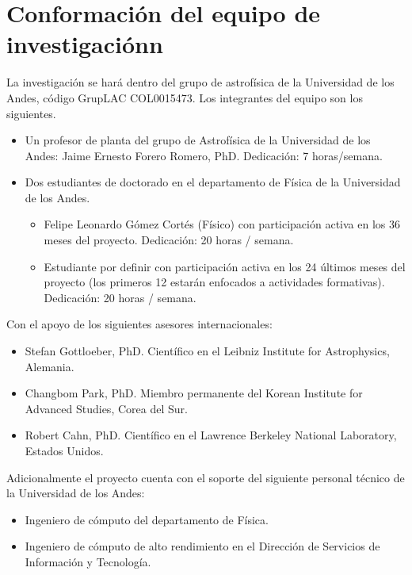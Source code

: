 \section{Conformaci\'on del equipo de investigaci\'onn}

La investigaci\'on se har\'a dentro del grupo de astrof\'isica de la
Universidad de los Andes, c\'odigo GrupLAC COL0015473. Los integrantes
del equipo son los siguientes. 


\begin{itemize}
\item Un profesor de planta del grupo de Astrof\'isica de la
  Universidad de los Andes: Jaime Ernesto  Forero Romero, PhD.
  Dedicaci\'on: 7 horas/semana.
\item Dos estudiantes de doctorado en el departamento de F\'isica de
  la Universidad de los Andes.
\begin{itemize}
\item Felipe Leonardo G\'omez Cort\'es
  (F\'isico) con participaci\'on activa en los 36 meses del proyecto. Dedicaci\'on: 20 horas / semana.  
  \item Estudiante por definir con participaci\'on activa en los 24 \'ultimos
    meses del proyecto (los primeros 12 estar\'an enfocados a
    actividades formativas).  Dedicaci\'on: 20 horas / semana.  
\end{itemize}
\end{itemize}

\noindent
Con el apoyo de los siguientes asesores internacionales:

\begin{itemize}

\item Stefan Gottloeber, PhD. Cient\'ifico en el Leibniz Institute for
  Astrophysics, Alemania.  
\item Changbom Park, PhD. Miembro permanente del Korean Institute for
  Advanced Studies, Corea del Sur. 
\item Robert Cahn, PhD. Cient\'ifico en el Lawrence Berkeley National
  Laboratory, Estados   Unidos. 
\end{itemize}

\noindent
Adicionalmente el proyecto cuenta con el soporte del siguiente
personal t\'ecnico de la Universidad de los Andes:

\begin{itemize}
\item{Ingeniero de c\'omputo del departamento de F\'isica.}
\item{Ingeniero de c\'omputo de alto rendimiento en el Direcci\'on de
  Servicios de Informaci\'on y Tecnolog\'ia.}
\end{itemize}
